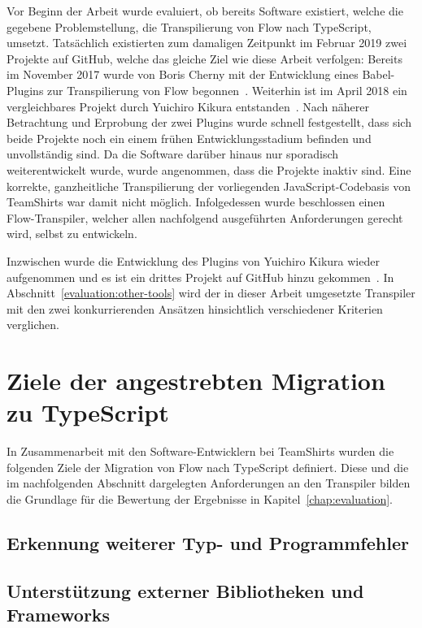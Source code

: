 Vor Beginn der Arbeit wurde evaluiert, ob bereits Software existiert, welche die gegebene Problemstellung, die Transpilierung von Flow nach TypeScript, umsetzt. Tatsächlich existierten zum damaligen Zeitpunkt im Februar 2019 zwei Projekte auf GitHub, welche das gleiche Ziel wie diese Arbeit verfolgen: Bereits im November 2017 wurde von Boris Cherny mit der Entwicklung eines Babel-Plugins zur Transpilierung von Flow begonnen~\autocite{CHERNY:FLOW_TO_TS}. Weiterhin ist im April 2018 ein vergleichbares Projekt durch Yuichiro Kikura entstanden~\autocite{KIKURA:FLOW_TO_TS}. Nach näherer Betrachtung und Erprobung der zwei Plugins wurde schnell festgestellt, dass sich beide Projekte noch ein einem frühen Entwicklungsstadium befinden und unvollständig sind. Da die Software darüber hinaus nur sporadisch weiterentwickelt wurde, wurde angenommen, dass die Projekte inaktiv sind. Eine korrekte, ganzheitliche Transpilierung der vorliegenden JavaScript-Codebasis von TeamShirts war damit nicht möglich. Infolgedessen wurde beschlossen einen Flow-Transpiler, welcher allen nachfolgend ausgeführten Anforderungen gerecht wird, selbst zu entwickeln.

Inzwischen wurde die Entwicklung des Plugins von Yuichiro Kikura wieder aufgenommen und es ist ein drittes Projekt auf GitHub hinzu gekommen~\autocite{KHAN:FLOW_TO_TS}. In Abschnitt~\ref{evaluation:other-tools} wird der in dieser Arbeit umgesetzte Transpiler mit den zwei konkurrierenden Ansätzen hinsichtlich verschiedener Kriterien verglichen.

\section{Ziele der angestrebten Migration zu TypeScript}
\label{analysis:goals}

In Zusammenarbeit mit den Software-Entwicklern bei TeamShirts wurden die folgenden Ziele der Migration von Flow nach TypeScript definiert. Diese und die im nachfolgenden Abschnitt dargelegten Anforderungen an den Transpiler bilden die Grundlage für die Bewertung der Ergebnisse in Kapitel~\ref{chap:evaluation}.

\subsection{Erkennung weiterer Typ- und Programmfehler}



\subsection{Unterstützung externer Bibliotheken und Frameworks}

